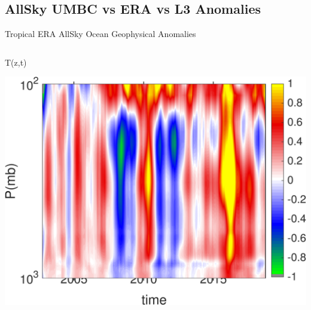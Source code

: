 \documentclass[10pt,t]{beamer}
\begin{document}
\subsection{AllSky UMBC vs ERA vs L3 Anomalies}
\begin{frame}{Tropical ERA AllSky Ocean Geophysical Anomalies}
\vspace{-0.35in}

\begin{columns}
\begin{column}{0.45\columnwidth}
\begin{block}{\footnotesize T(z,t)}
\vspace{-0.1in}
\begin{center}
\includegraphics[width=\linewidth]{Figs/CloudAnom/Desc_ocean_orig/era_cld_ptemp_anom_200209_201808.png}
\end{center}
\end{block}
\end{column}


\end{columns}
\end{frame}
\end{document}
